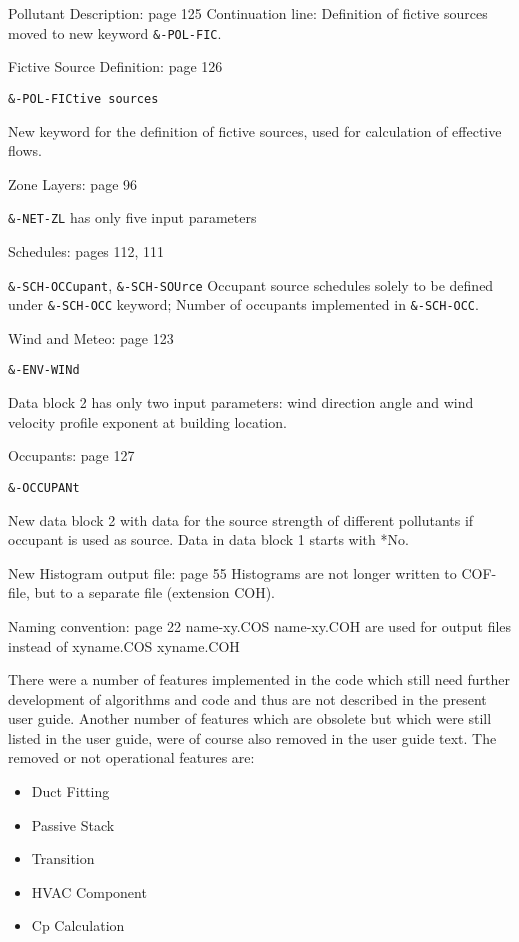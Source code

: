 \documentclass[10pt]{article}
\begin{document}
Pollutant Description: page 125 
Continuation line: 
Definition of fictive sources moved to new keyword \verb|&-POL-FIC|. 

Fictive Source Definition: page 126

\verb|&-POL-FICtive sources|

New keyword for the definition of fictive sources, used for calculation of effective flows.

Zone Layers: page 96 

\verb|&-NET-ZL| has only five input parameters 


Schedules: pages 112, 111 

\verb|&-SCH-OCCupant|, \verb|&-SCH-SOUrce|
Occupant source schedules solely to be defined under \verb|&-SCH-OCC| keyword; Number of occupants implemented in \verb|&-SCH-OCC|.

Wind and Meteo: page 123

\verb|&-ENV-WINd|

Data block 2 has only two input parameters: wind direction angle and wind velocity profile exponent at building location.

Occupants: page 127

\verb|&-OCCUPANt|

New data block 2 with data for the source strength of different pollutants if occupant is used as source. Data in data block 1 starts with *No.

New Histogram output file: page 55 Histograms are not longer written to COF-file, but to a separate file (extension COH).

Naming convention: page 22 \textlangle name\textrangle-xy.COS \textlangle name\textrangle-xy.COH are used for output files instead of xy\textlangle name\textrangle.COS xy\textlangle name\textrangle.COH

There were a number of features implemented in the code which still need further development of algorithms and code and thus are not described in the present user guide. Another number of features which are obsolete but which were still listed in the user guide, were of course also removed in the user guide text. The removed or not operational features are:

\begin{itemize}
\item Duct Fitting
\item Passive Stack
\item Transition
\item HVAC Component
\item Cp Calculation
\end{itemize}
\end{document}
